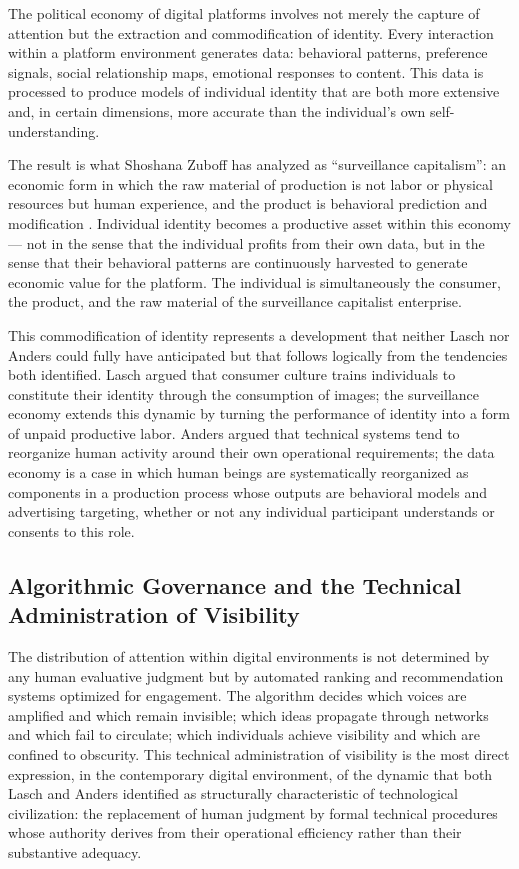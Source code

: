 \documentclass[12pt]{memoir}
\begin{document}
The political economy of digital platforms involves not merely the capture of attention
but the extraction and commodification of identity. Every interaction within a platform
environment generates data: behavioral patterns, preference signals, social relationship
maps, emotional responses to content. This data is processed to produce models of
individual identity that are both more extensive and, in certain dimensions, more
accurate than the individual's own self-understanding.

The result is what Shoshana Zuboff has analyzed as \enquote{surveillance capitalism}: an
economic form in which the raw material of production is not labor or physical resources
but human experience, and the product is behavioral prediction and modification
\citep{zuboff2019surveillance}. Individual identity becomes a productive asset within
this economy — not in the sense that the individual profits from their own data, but in
the sense that their behavioral patterns are continuously harvested to generate economic
value for the platform. The individual is simultaneously the consumer, the product, and
the raw material of the surveillance capitalist enterprise.

This commodification of identity represents a development that neither Lasch nor Anders
could fully have anticipated but that follows logically from the tendencies both identified.
Lasch argued that consumer culture trains individuals to constitute their identity through
the consumption of images; the surveillance economy extends this dynamic by turning
the performance of identity into a form of unpaid productive labor. Anders argued that
technical systems tend to reorganize human activity around their own operational
requirements; the data economy is a case in which human beings are systematically
reorganized as components in a production process whose outputs are behavioral
models and advertising targeting, whether or not any individual participant understands
or consents to this role.

\subsection{Algorithmic Governance and the Technical Administration of Visibility}

The distribution of attention within digital environments is not determined by any
human evaluative judgment but by automated ranking and recommendation systems
optimized for engagement. The algorithm decides which voices are amplified and which
remain invisible; which ideas propagate through networks and which fail to circulate;
which individuals achieve visibility and which are confined to obscurity. This technical
administration of visibility is the most direct expression, in the contemporary digital
environment, of the dynamic that both Lasch and Anders identified as structurally
characteristic of technological civilization: the replacement of human judgment
by formal technical procedures whose authority derives from their operational efficiency
rather than their substantive adequacy.
\end{document}
